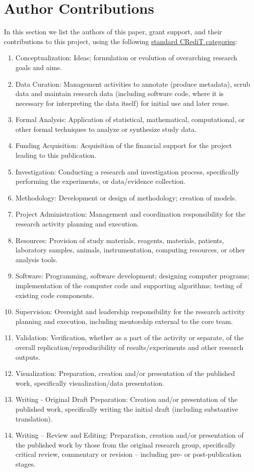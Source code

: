 \section{Author Contributions}

In this section we list the authors of this paper, grant support, and their contributions to this project, using the following \href{https://credit.niso.org/}{standard CRediT categories}:

\begin{enumerate}
    \item Conceptualization: Ideas; formulation or evolution of overarching research goals and aims.
    \item Data Curation: Management activities to annotate (produce metadata), scrub data and maintain research data (including software code, where it is necessary for interpreting the data itself) for initial use and later reuse.
    \item Formal Analysis: Application of statistical, mathematical, computational, or other formal techniques to analyze or synthesize study data.
    \item Funding Acquisition: Acquisition of the financial support for the project leading to this publication.
    \item Investigation: Conducting a research and investigation process, specifically performing the experiments, or data/evidence collection.
    \item Methodology: Development or design of methodology; creation of models.
    \item Project Administration: Management and coordination responsibility for the research activity planning and execution.
    \item Resources: Provision of study materials, reagents, materials, patients, laboratory samples, animals, instrumentation, computing resources, or other analysis tools.
    \item Software: Programming, software development; designing computer programs; implementation of the computer code and supporting algorithms; testing of existing code components.
    \item Supervision: Oversight and leadership responsibility for the research activity planning and execution, including mentorship external to the core team.
    \item Validation: Verification, whether as a part of the activity or separate, of the overall replication/reproducibility of results/experiments and other research outputs.
    \item Visualization: Preparation, creation and/or presentation of the published work, specifically visualization/data presentation.
    \item Writing - Original Draft Preparation: Creation and/or presentation of the published work, specifically writing the initial draft (including substantive translation).
    \item Writing – Review and Editing: Preparation, creation and/or presentation of the published work by those from the original research group, specifically critical review, commentary or revision – including pre- or post-publication stages.
\end{enumerate}

